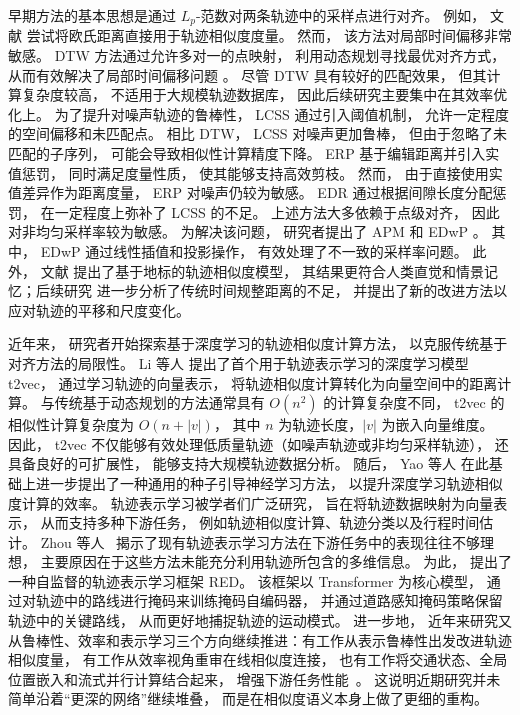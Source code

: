 早期方法的基本思想是通过 $L_p$-范数对两条轨迹中的采样点进行对齐。 例如， 文献  尝试将欧氏距离直接用于轨迹相似度度量。 然而， 该方法对局部时间偏移非常敏感。 DTW 方法通过允许多对一的点映射， 利用动态规划寻找最优对齐方式， 从而有效解决了局部时间偏移问题 。 尽管 DTW 具有较好的匹配效果， 但其计算复杂度较高， 不适用于大规模轨迹数据库， 因此后续研究主要集中在其效率优化上。 为了提升对噪声轨迹的鲁棒性， LCSS  通过引入阈值机制， 允许一定程度的空间偏移和未匹配点。 相比 DTW， LCSS 对噪声更加鲁棒， 但由于忽略了未匹配的子序列， 可能会导致相似性计算精度下降。 ERP  基于编辑距离并引入实值惩罚， 同时满足度量性质， 使其能够支持高效剪枝。 然而， 由于直接使用实值差异作为距离度量， ERP 对噪声仍较为敏感。 EDR  通过根据间隙长度分配惩罚， 在一定程度上弥补了 LCSS 的不足。 上述方法大多依赖于点级对齐， 因此对非均匀采样率较为敏感。 为解决该问题， 研究者提出了 APM  和 EDwP 。 其中， EDwP 通过线性插值和投影操作， 有效处理了不一致的采样率问题。 此外， 文献  提出了基于地标的轨迹相似度模型， 其结果更符合人类直觉和情景记忆；后续研究  进一步分析了传统时间规整距离的不足， 并提出了新的改进方法以应对轨迹的平移和尺度变化。


近年来， 研究者开始探索基于深度学习的轨迹相似度计算方法， 以克服传统基于对齐方法的局限性。 Li 等人  提出了首个用于轨迹表示学习的深度学习模型 t2vec， 通过学习轨迹的向量表示， 将轨迹相似度计算转化为向量空间中的距离计算。 与传统基于动态规划的方法通常具有 $O(n^2)$ 的计算复杂度不同， t2vec 的相似性计算复杂度为 $O(n + |v|)$， 其中 $n$ 为轨迹长度，$|v|$ 为嵌入向量维度。 因此， t2vec 不仅能够有效处理低质量轨迹（如噪声轨迹或非均匀采样轨迹）， 还具备良好的可扩展性， 能够支持大规模轨迹数据分析。 随后， Yao 等人  在此基础上进一步提出了一种通用的种子引导神经学习方法， 以提升深度学习轨迹相似度计算的效率。 轨迹表示学习被学者们广泛研究， 旨在将轨迹数据映射为向量表示， 从而支持多种下游任务， 例如轨迹相似度计算、轨迹分类以及行程时间估计。 Zhou 等人~ 揭示了现有轨迹表示学习方法在下游任务中的表现往往不够理想， 主要原因在于这些方法未能充分利用轨迹所包含的多维信息。 为此， 提出了一种自监督的轨迹表示学习框架 RED。 该框架以 Transformer 为核心模型， 通过对轨迹中的路线进行掩码来训练掩码自编码器， 并通过道路感知掩码策略保留轨迹中的关键路线， 从而更好地捕捉轨迹的运动模式。 进一步地， 近年来研究又从鲁棒性、效率和表示学习三个方向继续推进：有工作从表示鲁棒性出发改进轨迹相似度量， 有工作从效率视角重审在线相似度连接， 也有工作将交通状态、全局位置嵌入和流式并行计算结合起来， 增强下游任务性能~。 这说明近期研究并未简单沿着“更深的网络”继续堆叠， 而是在相似度语义本身上做了更细的重构。






